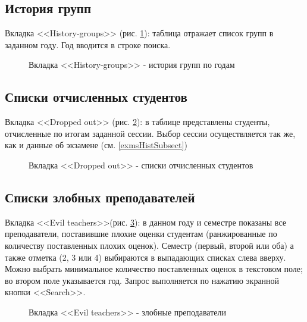\documentclass[zuevDbReport.tex]{subfiles}
\begin{document}
\newpage
\subsection{История групп}
Вкладка <<History-groups>> (рис. \ref{histGrps}): таблица отражает список групп в заданном году. Год вводится в строке поиска.
\begin{figure}[H]
\caption{Вкладка <<History-groups>> - история групп по годам}
\label{histGrps}
\end{figure}

\newpage
\subsection{Списки отчисленных студентов}
Вкладка <<Dropped out>> (рис. \ref{drpdd}): в таблице представлены студенты, отчисленные по итогам заданной сессии. Выбор сессии осуществляется так же, как и данные об экзамене (см.  \ref{exmsHistSubsect})
\begin{figure}[H]
\caption{Вкладка <<Dropped out>> - списки отчисленных студентов}
\label{drpdd}
\end{figure}

\newpage
\subsection{Списки злобных преподавателей}
Вкладка <<Evil teachers>>(рис. \ref{evilTch}): в данном году и семестре показаны все преподаватели, поставившие плохие оценки студентам (ранжированные по количеству поставленных плохих оценок). Семестр (первый, второй или оба) а также отметка (2, 3 или 4) выбираются в выпадающих списках слева вверху. Можно выбрать минимальное количество поставленных оценок в текстовом поле; во втором поле указывается год. Запрос выполняется по нажатию экранной кнопки <<Search>>.
\begin{figure}[H]
\caption{Вкладка <<Evil teachers>> - злобные преподаватели}
\label{evilTch}
\end{figure}

\newpage
\end{document}
